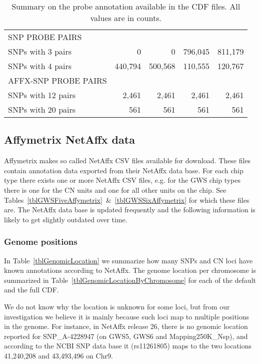 \documentclass[10pt,a4paper]{article}
\begin{document}
\begin{table}[hp]
\begin{center}
\begin{tabular}{|l|rr||rr|}
\hline
SNP PROBE PAIRS         &	  				&	  				&	 				   &	 				 \\
SNPs with 3 pairs       &        0  &        0  &    796,045 &   811,179 \\
SNPs with 4 pairs       &  440,794  &  500,568  &    110,555 &   120,767 \\
\hline
AFFX-SNP PROBE PAIRS     &	         &	  			 &	 				  &	 		      \\
SNPs with 12 pairs       &    2,461  &    2,461  &     2,461  &     2,461 \\
SNPs with 20 pairs       &      561  &      561  &       561  &       561 \\
\hline
\end{tabular}
\end{center}
\caption{Summary on the probe annotation available in the CDF files.  All values are in counts.}    %
\label{tblCdfProbes}
\end{table}



\subsection{Affymetrix NetAffx data}

Affymetrix makes so called NetAffx CSV files available for download.  These files contain annotation data exported from their NetAffx data base.  For each chip type there exists one or more NetAffx CSV files, e.g. for the GWS chip types there is one for the CN units and one for all other units on the chip.  See Tables~\ref{tblGWSFiveAffymetrix}~\&~\ref{tblGWSSixAffymetrix} for which these files are.
The NetAffx data base is updated frequently and the following information is likely to get slightly outdated over time. 

\subsubsection{Genome positions}
In Table~\ref{tblGenomicLocation} we summarize how many SNPs and CN loci have known annotations according to NetAffx.  
The genome location per chromosome is summarized in Table~\ref{tblGenomicLocationByChromosome} for each of the default and the full CDF.

We do not know why the location is unknown for some loci, but from our investigation we believe it is mainly because such loci map to multiple positions in the genome.  For instance, in NetAffx release 26, there is no genomic location reported for SNP\_A-4228947 (on GWS5, GWS6 and Mapping250K\_Nsp), and according to the NCBI SNP data base it (rs11261805) maps to the two locations 41,240,208 and 43,493,496 on Chr9.
\end{document}
